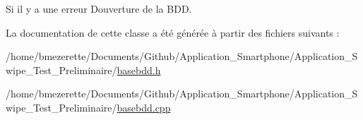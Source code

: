 Si il y a une erreur D\textquotesingle{}ouverture de la B\+DD. 



La documentation de cette classe a été générée à partir des fichiers suivants \+:\begin{DoxyCompactItemize}
\item 
/home/bmezerette/\+Documents/\+Github/\+Application\+\_\+\+Smartphone/\+Application\+\_\+\+Swipe\+\_\+\+Test\+\_\+\+Preliminaire/\hyperlink{basebdd_8h}{basebdd.\+h}\item 
/home/bmezerette/\+Documents/\+Github/\+Application\+\_\+\+Smartphone/\+Application\+\_\+\+Swipe\+\_\+\+Test\+\_\+\+Preliminaire/\hyperlink{basebdd_8cpp}{basebdd.\+cpp}\end{DoxyCompactItemize}
